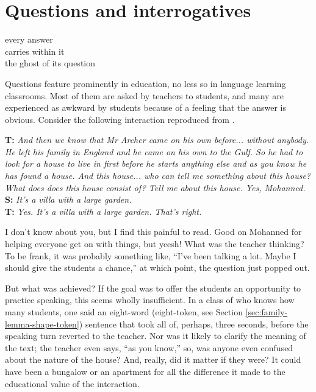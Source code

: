 \chapter{Questions and interrogatives} \label{ch:questions}

\epigraph{every answer\\
carries within it\\
the ghost of its question}{}

Questions feature prominently in education, no less so in language learning classrooms. Most of them are asked by teachers to students, and many are experienced as awkward by students because of a feeling that the answer is obvious. Consider the following interaction reproduced from \citet[23]{nunn1999purposes}.

\ea
\textbf{T:} \textit{And then we know that Mr Archer came on his own before... without
anybody. He left his family in England and he came on his own to the
Gulf. So he had to look for a house to live in first before he starts
anything else and as you know he has found a house. And this
house... who can tell me something about this house?
What does does this house consist of? Tell me about this house.
Yes, Mohanned.}\\
\textbf{S:} \textit{It's a villa with a large garden.}\\
\textbf{T:} \textit{Yes. It's a villa with a large garden. That's right.}\\
\z

I don't know about you, but I find this painful to read. Good on Mohanned for helping everyone get on with things, but yeesh! What was the teacher thinking? To be frank, it was probably something like, ``I've been talking a lot. Maybe I should give the students a chance,'' at which point, the question just popped out. 

But what was achieved? If the goal was to offer the students an opportunity to practice speaking, this seems wholly insufficient. In a class of who knows how many students, one said an eight-word (eight-token, see Section \ref{sec:family-lemma-shape-token}) sentence that took all of, perhaps, three seconds, before the speaking turn reverted to the teacher. Nor was it likely to clarify the meaning of the text; the teacher even says, ``as you know,'' so, was anyone even confused about the nature of the house?  And, really, did it matter if they were? It could have been a bungalow or an apartment for all the difference it made to the educational value of the interaction.

